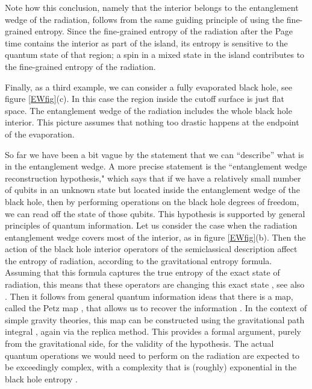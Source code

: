  
Note how this conclusion, namely that the interior belongs to the entanglement wedge of the radiation, follows from the same guiding principle of using the fine-grained entropy. Since the fine-grained entropy of the radiation after the Page time contains the interior as part of the island, its entropy is sensitive to the quantum state of that region; a spin in a mixed state in the island contributes to the fine-grained entropy of the radiation.


Finally, as a third example,  we can consider a fully evaporated black hole, see figure \ref{EWfig}(c). In this case the region inside the cutoff surface is just flat space. The entanglement wedge of the radiation includes the whole black hole interior. This picture assumes that nothing too drastic happens at the endpoint of the evaporation. 

    
 
 So far we have been a bit vague by the statement that we can ``describe'' what is in the entanglement wedge. A more precise statement is the ``entanglement wedge reconstruction hypothesis," which says that if we have a relatively small number of qubits  in an unknown state but located inside the entanglement wedge of the black hole, then by performing   operations on the black hole degrees of freedom, we can read off the state of those qubits. 
   This  hypothesis is supported by general principles of quantum information. Let us consider the case when the radiation entanglement wedge covers most of the interior, as in figure \ref{EWfig}(b).  Then the action of the  black hole  interior  operators of the semiclassical description   affect the entropy of radiation, according to the gravitational entropy formula. Assuming that this formula captures  the true entropy of the exact state of radiation, this means that these operators are changing this exact state \cite{Jafferis:2015del,Dong:2016eik}, see also \cite{Almheiri:2014lwa}.   Then it follows from general quantum information ideas that there is a map, called the 
   Petz map \cite{PetzBook},  that allows us to recover the information \cite{Cotler:2017erl}. In the context of simple gravity theories, this map can be constructed using the gravitational path integral \cite{Penington:2019kki}, again via the replica method. This provides a formal argument, purely from the gravitational side, for the validity of the hypothesis. 
    The actual quantum operations we would need to perform on the radiation are expected to be exceedingly complex, with a complexity that is (roughly) exponential in the black hole entropy 
    \cite{Brown:2019rox,Kim:2020cds}.
  
